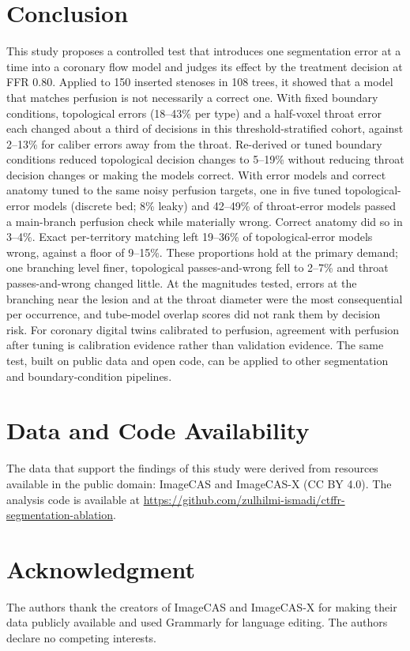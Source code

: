 \documentclass[journal,twoside,web]{ieeecolor}
\begin{document}
\section{Conclusion}
This study proposes a controlled test that introduces one segmentation error at a time into a coronary flow model and judges
its effect by the treatment decision at FFR 0.80. Applied to 150 inserted stenoses in 108 trees, it showed that a model that matches
perfusion is not necessarily a correct one. With fixed boundary conditions, topological errors (18--43\% per type) and a half-voxel throat error each changed about a third of decisions in this threshold-stratified cohort, against 2--13\% for caliber errors away from the throat. Re-derived or tuned boundary conditions reduced topological decision changes to 5--19\% without reducing throat decision changes or making the models correct. With error models and correct anatomy tuned to the same noisy perfusion targets, one in five tuned topological-error models (discrete bed; 8\% leaky) and 42--49\% of throat-error models passed a main-branch perfusion check while materially wrong. Correct anatomy did so in 3--4\%. Exact per-territory matching left 19--36\% of topological-error models wrong, against a floor of 9--15\%. These proportions hold at the primary demand; one branching level finer, topological passes-and-wrong fell to 2--7\% and throat passes-and-wrong changed little. At the magnitudes tested, errors at the branching near the lesion and at the throat diameter were the most consequential per occurrence, and tube-model overlap scores did not rank them by decision risk.
For coronary digital twins calibrated to perfusion, agreement with perfusion after tuning is calibration evidence
rather than validation evidence. The same test, built on public data and open code, can be applied to other segmentation and
boundary-condition pipelines.

\section*{Data and Code Availability}
The data that support the findings of this study were derived from resources available in the public domain: ImageCAS \cite{zeng2023} and ImageCAS-X \cite{imagecasx_data} (CC BY 4.0). The analysis code is available at \url{https://github.com/zulhilmi-ismadi/ctffr-segmentation-ablation}.

\section*{Acknowledgment}
The authors thank the creators of ImageCAS and ImageCAS-X for making their data publicly available and used Grammarly for language editing. The authors declare no competing interests.



\end{document}
